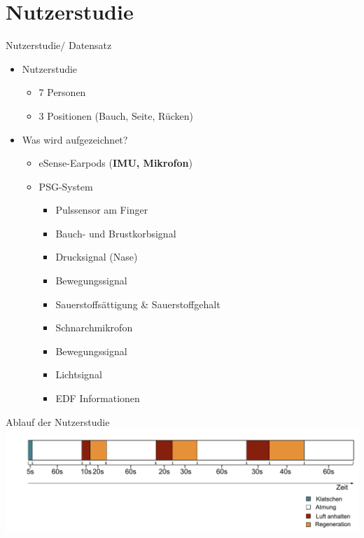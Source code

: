 \documentclass[18pt]{beamer}
\begin{document}
\section{Nutzerstudie}
\begin{frame}{Nutzerstudie$/$ Datensatz}
\begin{itemize}
    \item Nutzerstudie
    \begin{itemize}
        \item 7 Personen 
        \item 3 Positionen (Bauch, Seite, Rücken)
    \end{itemize}
    \item Was wird aufgezeichnet?
    \begin{itemize}
        \item eSense-Earpods (\textbf{IMU, Mikrofon})
        \item PSG-System
        \begin{itemize}
            \item Pulssensor am Finger
            \item Bauch- und Brustkorbsignal
            \item Drucksignal (Nase)
            \item Bewegungssignal
            \item Sauerstoffsättigung \& Sauerstoffgehalt
            \item Schnarchmikrofon
            \item Bewegungssignal
            \item Lichtsignal
            \item EDF Informationen
        \end{itemize}
    \end{itemize}
\end{itemize}
\end{frame}

\begin{frame}{Ablauf der Nutzerstudie}
    \includegraphics[scale=0.45]{images/study/study_flow2.pdf}
\end{frame}
\end{document}
